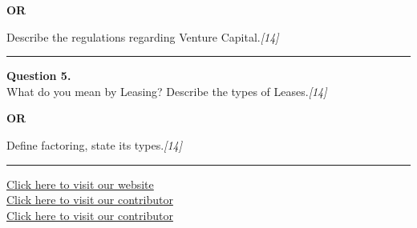 \documentclass[11pt,a4paper]{article}
\newcommand{\pts}[1]{\hfill   \textit{[#1]}}
\begin{document}
\centerline{   \textbf{OR}}

Describe the regulations regarding Venture Capital.\pts{14}

\medskip\rule{\linewidth}{0.2pt}




\noindent   \textbf{Question 5.} \\
What do you mean by Leasing? Describe the types of Leases.\pts{14}

\centerline{   \textbf{OR}}

Define factoring, state its types.\pts{14}

\vfill
\rule{\linewidth}{0.4pt}

\begin{center}\small
\href{https://bhu-exam.vercel.app/}{Click here to visit our website}\\[4pt]
\href{https://me-aryan.vercel.app/}{Click here to visit our contributor}\\[4pt]
\href{https://quashan-me.vercel.app/}{Click here to visit our contributor}
\end{center}
\end{document}
